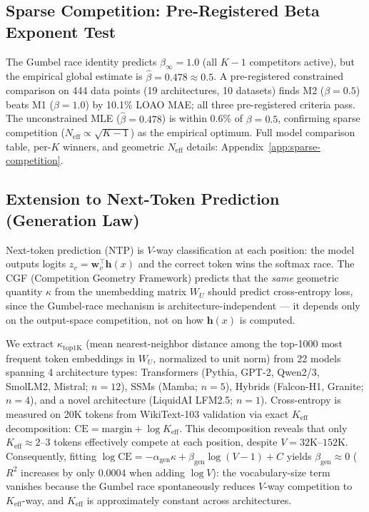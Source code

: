 \documentclass{article}
\begin{document}
\subsection{Sparse Competition: Pre-Registered Beta Exponent Test}

The Gumbel race identity predicts $\beta_\infty=1.0$ (all $K-1$ competitors active), but
the empirical global estimate is $\hat\beta=0.478\approx0.5$.
A pre-registered constrained comparison on 444 data points (19 architectures, 10 datasets)
finds M2 ($\beta=0.5$) beats M1 ($\beta=1.0$) by 10.1\% LOAO MAE; all three pre-registered criteria pass.
The unconstrained MLE ($\hat\beta=0.478$) is within 0.6\% of $\beta=0.5$, confirming sparse
competition ($N_\mathrm{eff}\propto\sqrt{K-1}$) as the empirical optimum.
Full model comparison table, per-$K$ winners, and geometric $N_\mathrm{eff}$ details:
Appendix~\ref{app:sparse-competition}.

\subsection{Extension to Next-Token Prediction (Generation Law)}
\label{sec:generation-law}

Next-token prediction (NTP) is $V$-way classification at each position: the model
outputs logits $z_v = \mathbf{w}_v^\top \mathbf{h}(x)$ and the correct token wins
the softmax race.  The CGF (Competition Geometry Framework) predicts that the
\emph{same} geometric quantity $\kappa$ from the unembedding matrix $W_U$ should
predict cross-entropy loss, since the Gumbel-race mechanism is architecture-independent
--- it depends only on the output-space competition, not on how $\mathbf{h}(x)$ is computed.

We extract $\kappa_{\mathrm{top1K}}$ (mean nearest-neighbor distance among the top-1000
most frequent token embeddings in $W_U$, normalized to unit norm) from 22 models
spanning 4 architecture types: Transformers (Pythia, GPT-2, Qwen2/3, SmolLM2, Mistral;
$n{=}12$), SSMs (Mamba; $n{=}5$), Hybrids (Falcon-H1, Granite; $n{=}4$), and a novel
architecture (LiquidAI LFM2.5; $n{=}1$).
Cross-entropy is measured on 20K tokens from WikiText-103 validation via exact
$K_{\mathrm{eff}}$ decomposition: $\mathrm{CE} = \mathrm{margin} + \log K_{\mathrm{eff}}$.
This decomposition reveals that only $K_{\mathrm{eff}} \approx 2$--$3$ tokens effectively
compete at each position, despite $V = 32$K--$152$K.
Consequently, fitting $\log\mathrm{CE} = -\alpha_\mathrm{gen}\kappa + \beta_\mathrm{gen}\log(V{-}1) + C$
yields $\beta_\mathrm{gen} \approx 0$ ($R^2$ increases by only $0.0004$ when adding $\log V$):
the vocabulary-size term vanishes because the Gumbel race spontaneously reduces $V$-way competition
to $K_{\mathrm{eff}}$-way, and $K_{\mathrm{eff}}$ is approximately constant across architectures.
\end{document}
